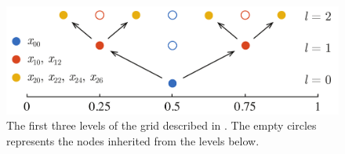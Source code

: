 \begin{figure}[t]
  \centering
  \includegraphics[width=1.0\columnwidth]{include/assets/figures/grid.pdf}
  \vspace{-1.5em}
  \caption{
    The first three levels of the grid described in . The empty
    circles represents the nodes inherited from the levels below.
  }
\end{figure}
